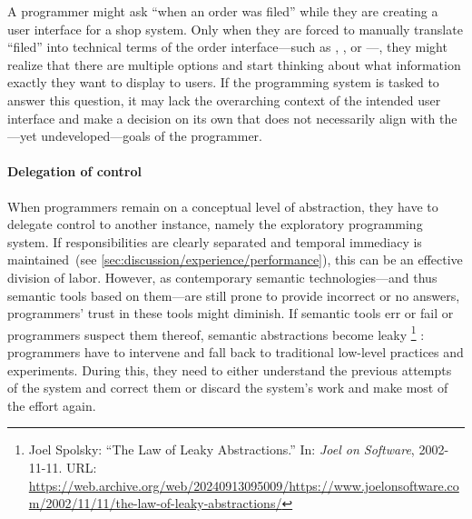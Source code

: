 \begin{example}
	A programmer might ask ``when an order was filed'' while they are creating a user interface for a shop system.
	Only when they are forced to manually translate ``filed'' into technical terms of the order interface---such as , , or ---, they might realize that there are multiple options and start thinking about what information exactly they want to display to users.
	If the programming system is tasked to answer this question, it may lack the overarching context of the intended user interface and make a decision on its own that does not necessarily align with the---yet undeveloped---goals of the programmer.
\end{example}

\paragraph{Delegation of control}
\label{par:discussion/experience/process/delegation}

When programmers remain on a conceptual level of abstraction, they have to delegate control to another instance, namely the exploratory programming system.
If responsibilities are clearly separated and temporal immediacy is maintained~(see \cref{sec:discussion/experience/performance}), this can be an effective division of labor.
However, as contemporary semantic technologies---and thus semantic tools based on them---are still prone to provide incorrect or no answers, programmers' trust in these tools might diminish.
If semantic tools err or fail or programmers suspect them thereof, semantic abstractions become leaky%
\footnote{\label{fn:joels_law}Joel Spolsky: ``The Law of Leaky Abstractions.'' In: \emph{Joel on Software}, 2002-11-11. URL: \url{https://web.archive.org/web/20240913095009/https://www.joelonsoftware.com/2002/11/11/the-law-of-leaky-abstractions/}}%
: programmers have to intervene and fall back to traditional low-level practices and experiments.
During this, they need to either understand the previous attempts of the system and correct them or discard the system's work and make most of the effort again.

